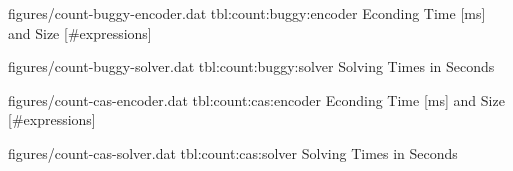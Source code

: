 
\EncoderStatsTable
  {figures/count-buggy-encoder.dat}
  {tbl:count:buggy:encoder}
  {Econding Time [ms] and Size [\#expressions]}


\SolverStatsTable
  {figures/count-buggy-solver.dat}
  {tbl:count:buggy:solver}
  {Solving Times in Seconds}

\newpage


\EncoderStatsTable
  {figures/count-cas-encoder.dat}
  {tbl:count:cas:encoder}
  {Econding Time [ms] and Size [\#expressions]}


\SolverStatsTable
  {figures/count-cas-solver.dat}
  {tbl:count:cas:solver}
  {Solving Times in Seconds}

